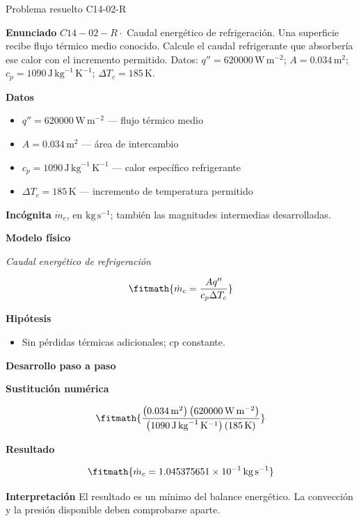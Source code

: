 \documentclass[10pt,openany]{book}
\begin{document}
\begin{studiumworked}{Problema resuelto C14-02-R}


\noindent\textbf{Enunciado}
\(C14-02-R \cdot\) Caudal energético de refrigeración. Una superficie recibe flujo térmico medio conocido. Calcule el caudal refrigerante que absorbería ese calor con el incremento permitido. Datos: \(q''=620000\, \mathrm{W}\,\mathrm{m}^{-2}\); \(A=0.034\, \mathrm{m}^{2}\); \(c_p=1090\, \mathrm{J}\,\mathrm{kg}^{-1}\,\mathrm{K}^{-1}\); \(\Delta T_c=185\, \mathrm{K}\).

\noindent\textbf{Datos}
\begin{itemize}
\item $q'' = 620000\,\mathrm{W}\,\mathrm{m}^{-2}$ — flujo térmico medio
\item $A = 0.034\,\mathrm{m}^{2}$ — área de intercambio
\item $c_p = 1090\,\mathrm{J}\,\mathrm{kg}^{-1}\,\mathrm{K}^{-1}$ — calor específico refrigerante
\item $\Delta T_c = 185\,\mathrm{K}$ — incremento de temperatura permitido
\end{itemize}

\noindent\textbf{Incógnita}
$\dot{m}_c$, en $\mathrm{kg\,s^{-1}}$; también las magnitudes intermedias desarrolladas.

\noindent\textbf{Modelo físico}

\noindent\textit{Caudal energético de refrigeración}

\[
\fitmath{\dot{m}_c=\frac{A q''}{c_p \Delta T_c}}
\]

\noindent\textbf{Hipótesis}
\begin{itemize}
\item Sin pérdidas térmicas adicionales; cp constante.
\end{itemize}

\noindent\textbf{Desarrollo paso a paso}



\noindent\textbf{Sustitución numérica}

\[
\fitmath{\frac{\left(0.034\,\mathrm{m}^{2}\right) \left(620000\,\mathrm{W}\,\mathrm{m}^{-2}\right)}{\left(1090\,\mathrm{J}\,\mathrm{kg}^{-1}\,\mathrm{K}^{-1}\right) \left(185\,\mathrm{K}\right)}}
\]

\noindent\textbf{Resultado}

\[
\fitmath{\dot{m}_c=1.045375651\times10^{-1}\,\mathrm{kg}\,\mathrm{s}^{-1}}
\]

\noindent\textbf{Interpretación}
El resultado es un mínimo del balance energético. La convección y la presión disponible deben comprobarse aparte.


\end{studiumworked}
\end{document}
